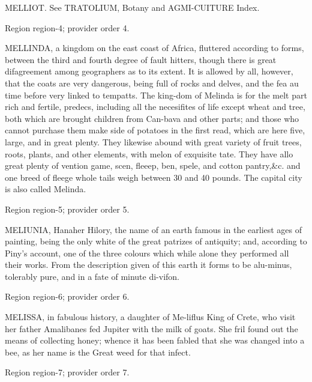\documentclass[11pt]{article}
\begin{document}
MELLIOT. See TRATOLIUM, Botany and AGMI-CUITURE Index.
\par

{\scriptsize\color{gray} Region region-4; provider order 4.\par}
\medskip

MELLINDA, a kingdom on the east coast of Africa, fluttered according to forms, between the third and fourth degree of fault hitters, though there is great difagreement among geographers as to its extent. It is allowed by all, however, that the coats are very dangerous, being full of rocks and delves, and the fea au time before very linked to tempatts. The king-dom of Melinda is for the melt part rich and fertile, predecs, including all the necesifites of life except wheat and tree, both which are brought children from Can-bava and other parts; and those who cannot purchase them make side of potatoes in the first read, which are here five, large, and in great plenty. They likewise abound with great variety of fruit trees, roots, plants, and other elements, with melon of exquisite tate. They have allo great plenty of vention game, scen, fleeep, ben, spele, and cotton pantry,\&c. and one breed of fleege whole tails weigh between 30 and 40 pounds. The capital city is also called Melinda.
\par

{\scriptsize\color{gray} Region region-5; provider order 5.\par}
\medskip

MELIUNIA, Hanaher Hilory, the name of an earth famous in the earliest ages of painting, being the only white of the great patrizes of antiquity; and, according to Piny's account, one of the three colours which while alone they performed all their works. From the description given of this earth it forms to be alu-minus, tolerably pure, and in a fate of minute di-vifon.
\par

{\scriptsize\color{gray} Region region-6; provider order 6.\par}
\medskip

MELISSA, in fabulous history, a daughter of Me-liflus King of Crete, who visit her father Amalibanes fed Jupiter with the milk of goats. She fril found out the means of collecting honey; whence it has been fabled that she was changed into a bee, as her name is the Great weed for that infect.
\par

{\scriptsize\color{gray} Region region-7; provider order 7.\par}
\medskip
\end{document}
